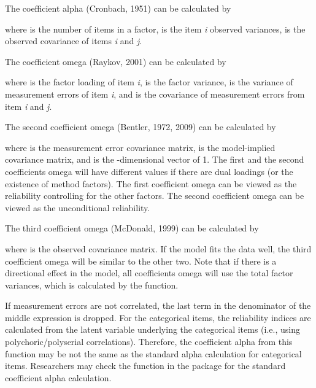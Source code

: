 \documentclass[a4paper]{book}
\begin{document}
\begin{Details}\relax
The coefficient alpha (Cronbach, 1951) can be calculated by 


where  is the number of items in a factor,  is the item \emph{i} observed variances,  is the observed covariance of items \emph{i} and \emph{j}.

The coefficient omega (Raykov, 2001) can be calculated by 


where  is the factor loading of item \emph{i}, \eqn{\psi}{} is the factor variance,  is the variance of measurement errors of item \emph{i}, and  is the covariance of measurement errors from item \emph{i} and \emph{j}. 

The second coefficient omega (Bentler, 1972, 2009) can be calculated by 


where \eqn{\Theta}{} is the measurement error covariance matrix, \eqn{\hat{\Sigma}}{} is the model-implied covariance matrix, and  is the -dimensional vector of 1. The first and the second coefficients omega will have different values if there are dual loadings (or the existence of method factors). The first coefficient omega can be viewed as the reliability controlling for the other factors. The second coefficient omega can be viewed as the unconditional reliability. 

The third coefficient omega (McDonald, 1999) can be calculated by


where \eqn{\Sigma}{} is the observed covariance matrix. If the model fits the data well, the third coefficient omega will be similar to the other two. Note that if there is a directional effect in the model, all coefficients omega will use the total factor variances, which is calculated by the  function.

If measurement errors are not correlated, the last term in the denominator of the middle expression is dropped. For the categorical items, the reliability indices are calculated from the latent variable underlying the categorical items (i.e., using polychoric/polyserial correlations). Therefore, the coefficient alpha from this function may be not the same as the standard alpha calculation for categorical items. Researchers may check the  function in the  package for the standard coefficient alpha calculation. 
\end{Details}
\end{document}
